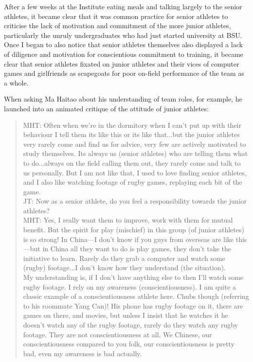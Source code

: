 \begin{CJK}{UTF8}{gbsn}
After a few weeks at the Institute eating meals and talking largely to the senior athletes, it became clear that it was common practice for senior athletes to criticise the lack of motivation and commitment of the more junior athletes, particularly the unruly undergraduates who had just started university at BSU.  Once I began to also notice that senior athletes themselves also displayed a lack of diligence and motivation for conscientious commitment to training, it became clear that senior athletes fixated on junior athletes and their vices of computer games and girlfriends as scapegoats for poor on-field performance of the team as a whole.

When asking Ma Haitao about his understanding of team roles, for example, he launched into an animated critique of the attitude of junior athletes:


  \begin{quotation}
    MHT: Often when we're in the dormitory when I can't put up with their behaviour I tell them its like this or its like that...but the junior athletes very rarely come and find us for advice, very few are actively motivated to study themselves. Its always us (senior athletes) who are telling them what to do...always on the field calling them out, they rarely come and talk to us personally.  But I am not like that, I used to love finding senior athletes, and I also like watching footage of rugby games, replaying each bit of the game.\\
    JT: Now as a senior athlete, do you feel a responsibility towards the junior athletes?\\
    MHT: Yes, I really want them to improve, work with them for mutual benefit.  But the spirit for play (mischief) in this group (of junior athletes) is so strong! In China---I don't know if you guys from overseas are like this---but in China all they want to do is play games, they don't take the initiative to learn.  Rarely do they grab a computer and watch some (rugby) footage...I don’t know how they understand (the situation).
\\
    My understanding is, if I don’t have anything else to then I’ll watch some rugby footage. I rely on my awareness (conscientiousness).  I am quite a classic example of a conscientiousness athlete here.  Chubs though (referring to his roommate Yang Can)!  His phone has rugby footage on it, there are games on there, and movies, but unless I insist that he watches it he doesn't watch any of the rugby footage, rarely do they watch any rugby footage.  They are not conscientiousness at all. We Chinese, our conscientiousness compared to you folk, our conscientiousness is pretty bad, even my awareness is bad actually.
  \end{quotation}


\end{CJK}
